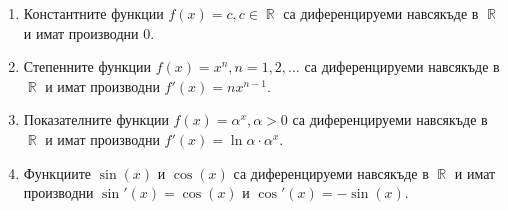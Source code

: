 \documentclass{../../common/topic}
\begin{document}
\begin{theorem}\label{thm:elementary_derivatives}
  \hfill
  \begin{enumerate}
    \item Константните функции \( f(x) = c, c \in \BbbR \) са диференцируеми навсякъде в \( \BbbR \) и имат производни \( 0 \).
    \item Степенните функции \( f(x) = x^n, n = 1, 2, \ldots \) са диференцируеми навсякъде в \( \BbbR \) и имат производни \( f'(x) = n x^{n-1} \).
    \item Показателните функции \( f(x) = \alpha^x, \alpha > 0 \) са диференцируеми навсякъде в \( \BbbR \) и имат производни \( f'(x) = \ln \alpha \cdot \alpha^x \).
    \item Функциите \( \sin(x) \) и \( \cos(x) \) са диференцируеми навсякъде в \( \BbbR \) и имат производни \( \sin'(x) = \cos(x) \) и \( \cos'(x) = -\sin(x) \).
  \end{enumerate}
\end{theorem}
\end{document}
